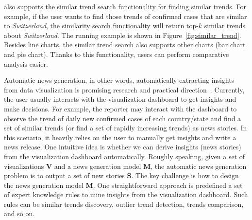 \sys also supports the similar trend search functionality for finding similar trends. 
For example, if the user wants to find those trends of confirmed cases that are similar to {\em Switzerland}, the similarity search functionality will return top-$k$ similar trends about {\em Switzerland}.
The running example is shown in Figure~\ref{fig:similar_trend}. 
Besides line charts,  the similar trend search also supports other charts (\eg bar chart and pie chart).
Thanks to this functionality,  users can perform comparative analysis easier.

Automatic news generation, in other words, automatically extracting insights from data visualization is promising research and practical direction~\cite{DBLP:journals/vldb/QinLTL20}.
Currently, the user usually interacts with the visualization dashboard to get insights and make decisions. 
For example, the reporter may interact with the dashboard to observe the trend of daily new confirmed cases of each country/state and find a set of similar trends (or find a set of rapidly increasing trends) as news stories.
In this scenario, it heavily relies on the user to manually get insights and write a news release.
One intuitive idea is whether we can derive insights (news stories) from the visualization dashboard automatically. 
%
Roughly speaking, given a set of visualizations $\mathbf{V}$ and a news generation model $\mathbf{M}$, the automatic news generation problem is to output a set of new stories $\mathbf{S}$. 
The key challenge is how to design the news generation model $\mathbf{M}$.
One straightforward approach is predefined a set of expert knowledge rules to mine insights from the visualization dashboard.
%
Such rules can be similar trends discovery, outlier trend detection, trends comparison, and so on.





